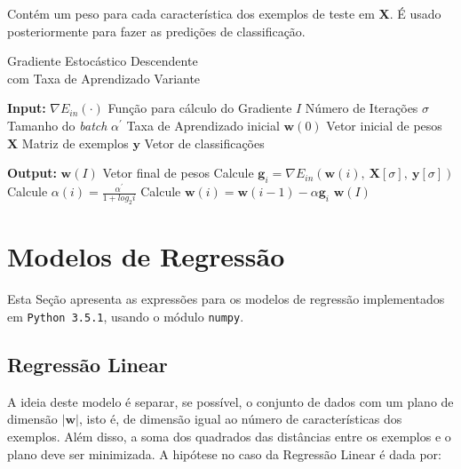 \documentclass[a4paper, 12pt]{article}
\begin{document}
Contém um peso para cada característica dos exemplos de teste
em \textbf{X}. É usado posteriormente para fazer as predições
de classificação.

\begin{algorithm}[htpb]
    \caption{Gradiente Estocástico Descendente \\ com Taxa de Aprendizado Variante}
    \label{alg:GSD}
    \begin{algorithmic}[1]
        \Statex \item[\textbf{Input:}]
        \Statex $\nabla{}E_{in}(\cdot)$ \Comment Função para cálculo do Gradiente
        \Statex $I$ \Comment Número de Iterações
        \Statex $\sigma$ \Comment Tamanho do \textit{batch}
        \Statex $\alpha^{\prime}$ \Comment Taxa de Aprendizado inicial
        \Statex $\textbf{w}(0)$ \Comment Vetor inicial de pesos
        \Statex $\textbf{X}$ \Comment Matriz de exemplos
        \Statex $\textbf{y}$ \Comment Vetor de classificações
        \Statex \item[\textbf{Output:}]
        \Statex $\textbf{w}(I)$ \Comment Vetor final de pesos
        \Statex
        \State Calcule $\textbf{g}_i = \nabla{}E_{in}(\textbf{w}(i),\: \textbf{X}[\sigma],\: \textbf{y}[\sigma])$
        \State Calcule $\alpha(i) = \frac{\alpha^{\prime}}{1 + log_{2}i}$
        \State Calcule $\textbf{w}(i) = \textbf{w}(i -1) - \alpha{}\textbf{g}_i$
        \EndFor
        \State \Return $\textbf{w}(I)$
    \end{algorithmic}
\end{algorithm}


\section{Modelos de Regressão} \label{sec:regr}

Esta Seção apresenta as expressões para os modelos de regressão implementados
em \texttt{Python 3.5.1}, usando o módulo \texttt{numpy}.

\subsection{Regressão Linear}

A ideia deste modelo é separar, se possível, o conjunto de dados com um plano
de dimensão $|\textbf{w}|$, isto é, de dimensão igual ao número de
características dos exemplos. Além disso, a soma dos quadrados das distâncias
entre os exemplos e o plano deve ser minimizada.
A hipótese no caso da Regressão Linear é dada por:
\end{document}
